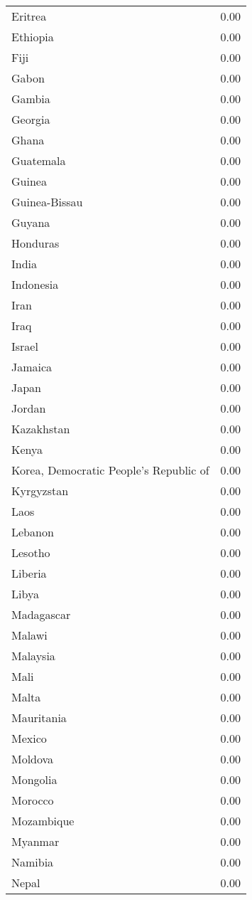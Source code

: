 \begin{table}[ht]
\begin{tabular}{lr}
  Eritrea & 0.00 \\ 
  Ethiopia & 0.00 \\ 
  Fiji & 0.00 \\ 
  Gabon & 0.00 \\ 
  Gambia & 0.00 \\ 
  Georgia & 0.00 \\ 
  Ghana & 0.00 \\ 
  Guatemala & 0.00 \\ 
  Guinea & 0.00 \\ 
  Guinea-Bissau & 0.00 \\ 
  Guyana & 0.00 \\ 
  Honduras & 0.00 \\ 
  India & 0.00 \\ 
  Indonesia & 0.00 \\ 
  Iran & 0.00 \\ 
  Iraq & 0.00 \\ 
  Israel & 0.00 \\ 
  Jamaica & 0.00 \\ 
  Japan & 0.00 \\ 
  Jordan & 0.00 \\ 
  Kazakhstan & 0.00 \\ 
  Kenya & 0.00 \\ 
  Korea, Democratic People's Republic of & 0.00 \\ 
  Kyrgyzstan & 0.00 \\ 
  Laos & 0.00 \\ 
  Lebanon & 0.00 \\ 
  Lesotho & 0.00 \\ 
  Liberia & 0.00 \\ 
  Libya & 0.00 \\ 
  Madagascar & 0.00 \\ 
  Malawi & 0.00 \\ 
  Malaysia & 0.00 \\ 
  Mali & 0.00 \\ 
  Malta & 0.00 \\ 
  Mauritania & 0.00 \\ 
  Mexico & 0.00 \\ 
  Moldova & 0.00 \\ 
  Mongolia & 0.00 \\ 
  Morocco & 0.00 \\ 
  Mozambique & 0.00 \\ 
  Myanmar & 0.00 \\ 
  Namibia & 0.00 \\ 
  Nepal & 0.00 \\ 

\end{tabular}
\end{table}
